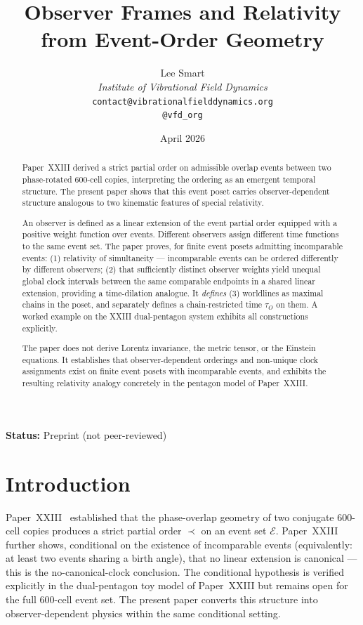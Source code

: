 \documentclass[12pt]{article}
\title{Observer Frames and Relativity\\from Event-Order Geometry}
\author{%
  Lee Smart\\[4pt]
  \textit{Institute of Vibrational Field Dynamics}\\[2pt]
  \texttt{contact@vibrationalfielddynamics.org}\\[2pt]
  \texttt{@vfd\_org}%
}
\date{April 2026}
\newcommand{\Ecal}{\mathcal{E}}
\begin{document}
\maketitle

\noindent\textbf{Status:} Preprint (not peer-reviewed)

\begin{abstract}
Paper~XXIII derived a strict partial order on admissible overlap events between two phase-rotated 600-cell copies, interpreting the ordering as an emergent temporal structure. The present paper shows that this event poset carries observer-dependent structure analogous to two kinematic features of special relativity.

An observer is defined as a linear extension of the event partial order equipped with a positive weight function over events. Different observers assign different time functions to the same event set. The paper proves, for finite event posets admitting incomparable events: (1) relativity of simultaneity --- incomparable events can be ordered differently by different observers; (2) that sufficiently distinct observer weights yield unequal global clock intervals between the same comparable endpoints in a shared linear extension, providing a time-dilation analogue. It \emph{defines} (3) worldlines as maximal chains in the poset, and separately defines a chain-restricted time $\tau_O$ on them. A worked example on the XXIII dual-pentagon system exhibits all constructions explicitly.

The paper does not derive Lorentz invariance, the metric tensor, or the Einstein equations. It establishes that observer-dependent orderings and non-unique clock assignments exist on finite event posets with incomparable events, and exhibits the resulting relativity analogy concretely in the pentagon model of Paper~XXIII.
\end{abstract}

\section{Introduction}\label{sec:intro}

Paper~XXIII~\citep{SmartXXIII} established that the phase-overlap geometry of two conjugate 600-cell copies produces a strict partial order $\prec$ on an event set $\Ecal$. Paper~XXIII further shows, conditional on the existence of incomparable events (equivalently: at least two events sharing a birth angle), that no linear extension is canonical --- this is the no-canonical-clock conclusion. The conditional hypothesis is verified explicitly in the dual-pentagon toy model of Paper~XXIII but remains open for the full 600-cell event set. The present paper converts this structure into observer-dependent physics within the same conditional setting.
\end{document}
